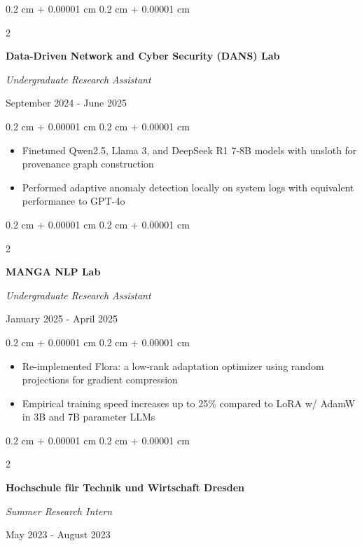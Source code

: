 \documentclass[10pt, letterpaper]{article}
\newenvironment{highlights}{
    \begin{itemize}[
        topsep=0.10 cm,
        parsep=0.10 cm,
        partopsep=0pt,
        itemsep=0pt,
        leftmargin=0.4 cm + 10pt
    ]
}{
    \end{itemize}
}
\newenvironment{onecolentry}{
    \begin{adjustwidth}{
        0.2 cm + 0.00001 cm
    }{
        0.2 cm + 0.00001 cm
    }
}{
    \end{adjustwidth}
}
\newenvironment{twocolentry}[2][]{
    \begin{adjustwidth}{
        0.2 cm + 0.00001 cm
    }{
        0.2 cm + 0.00001 cm
    }
    \def\secondColumn{#2}
    \setcolumnwidth{\fill, 4.5 cm}
    \begin{paracol}{2}
}{
    \switchcolumn \raggedleft \secondColumn
    \end{paracol}
    \end{adjustwidth}
}
\begin{document}
        \vspace{0.09 cm}

        \begin{twocolentry}{
            September 2024 - June 2025
        }
            \textbf{Data-Driven Network and Cyber Security (DANS) Lab}

            \textit{Undergraduate Research Assistant}
        \end{twocolentry}

        \vspace{0.09 cm}
        \begin{onecolentry}
            \begin{highlights}
                \item Finetuned Qwen2.5, Llama 3, and DeepSeek R1 7-8B models with unsloth for provenance graph construction
                \item Performed adaptive anomaly detection locally on system logs with equivalent performance to GPT-4o
            \end{highlights}
        \end{onecolentry}

        \vspace{0.09 cm}

        \begin{twocolentry}{
            January 2025 - April 2025
        }
            \textbf{MANGA NLP Lab}

            \textit{Undergraduate Research Assistant}
        \end{twocolentry}

        \vspace{0.09 cm}
        \begin{onecolentry}
            \begin{highlights}
                \item Re-implemented Flora: a low-rank adaptation optimizer using random projections for gradient compression
                \item Empirical training speed increases up to 25\% compared to LoRA w/ AdamW in 3B and 7B parameter LLMs
            \end{highlights}
        \end{onecolentry}

        \vspace{0.09 cm}

        \begin{twocolentry}{
            May 2023 - August 2023
        }
            \textbf{Hochschule für Technik und Wirtschaft Dresden}

            \textit{Summer Research Intern}
        \end{twocolentry}
\end{document}
